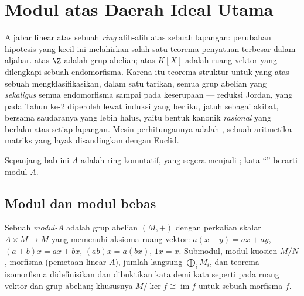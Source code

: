 \chapter{Modul atas Daerah Ideal Utama}\label{ch:b3:modules}

Aljabar linear atas sebuah \emph{ring} alih-alih atas sebuah lapangan: perubahan
hipotesis yang kecil ini melahirkan salah satu teorema penyatuan
terbesar dalam aljabar.  atas $\Z$ adalah grup abelian;  atas
$K[X]$ adalah ruang vektor yang dilengkapi sebuah endomorfisma. Karena itu
teorema struktur untuk  yang  atas sebuah 
mengklasifikasikan, dalam satu tarikan, semua grup abelian yang  \emph{sekaligus} semua endomorfisma sampai pada keserupaan ---
reduksi Jordan, yang pada Tahun ke-2 diperoleh lewat induksi yang berliku,
jatuh sebagai akibat, bersama saudaranya yang lebih halus, yaitu
bentuk kanonik \emph{rasional} yang berlaku atas setiap lapangan. Mesin
perhitungannya adalah , sebuah aritmetika
matriks yang layak disandingkan dengan Euclid.

Sepanjang bab ini $A$ adalah ring komutatif, yang segera menjadi ; kata ``''
berarti modul-$A$.

\section{Modul dan modul bebas}

\begin{definition}\label{def:b3:modules:module}
Sebuah \emph{modul-$A$} adalah grup abelian $(M, +)$
dengan perkalian skalar $A \times M \to M$ yang memenuhi
aksioma ruang vektor: $a(x + y) = ax + ay$, $(a + b)x = ax + bx$,
$(ab)x = a(bx)$, $1x = x$. Submodul, modul kuosien $M/N$, morfisma
(pemetaan linear-$A$), jumlah langsung $\bigoplus_i M_i$, dan
teorema isomorfisma didefinisikan dan dibuktikan kata demi kata seperti pada
ruang vektor dan grup abelian; khususnya $M/\ker f \cong
\operatorname{im} f$ untuk sebuah morfisma $f$.
\end{definition}

